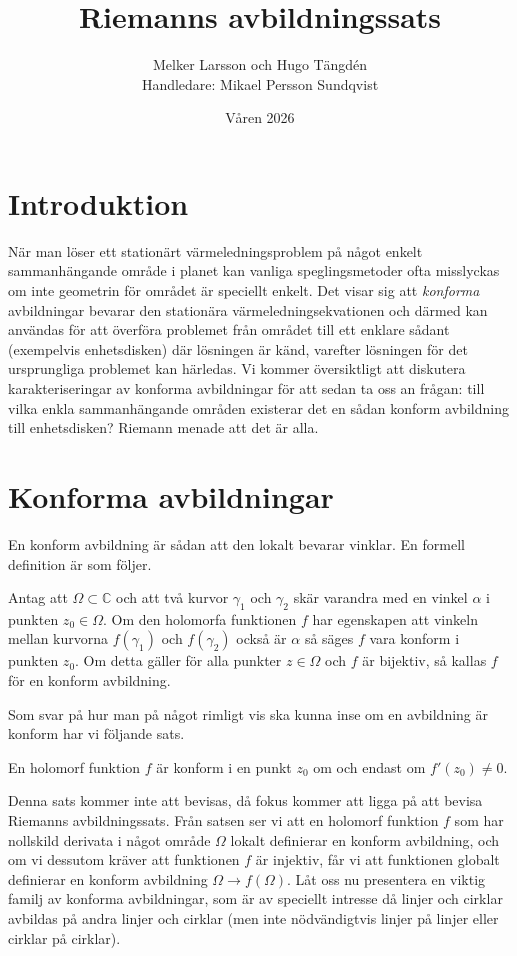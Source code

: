 \documentclass{article}
\title{Riemanns avbildningssats}
\author{Melker Larsson och Hugo Tängdén \\ \vspace{0.2cm} Handledare: Mikael Persson Sundqvist}
\date{Våren 2026}
\begin{document}
\maketitle

\section{Introduktion}
När man löser ett stationärt värmeledningsproblem på något enkelt sammanhängande område i planet kan vanliga speglingsmetoder ofta misslyckas om inte geometrin för området är speciellt enkelt. Det visar sig att \emph{konforma} avbildningar bevarar den stationära värmeledningsekvationen och därmed kan användas för att överföra problemet från området till ett enklare sådant (exempelvis enhetsdisken) där lösningen är känd, varefter lösningen för det ursprungliga problemet kan härledas. Vi kommer översiktligt att diskutera karakteriseringar av konforma avbildningar för att sedan ta oss an frågan: till vilka enkla sammanhängande områden existerar det en sådan konform avbildning till enhetsdisken? Riemann menade att det är alla.

\section{Konforma avbildningar}

En konform avbildning är sådan att den lokalt bevarar vinklar. En formell definition är som följer.
\begin{definition}
	Antag att $\Omega \subset \mathbb{C}$ och att två kurvor $\gamma_1$ och $\gamma_2$ skär varandra med en vinkel $\alpha$ i punkten $z_0 \in \Omega$. Om den holomorfa funktionen $f$ har egenskapen att vinkeln mellan kurvorna $f(\gamma_1)$ och $f(\gamma_2)$ också är $\alpha$ så säges $f$ vara konform i punkten $z_0$. Om detta gäller för alla punkter $z \in \Omega$ och $f$ är bijektiv, så kallas $f$ för en konform avbildning.
\end{definition}

Som svar på hur man på något rimligt vis ska kunna inse om en avbildning är konform har vi följande sats.

\begin{theorem}
	En holomorf funktion $f$ är konform i en punkt $z_0$ om och endast om $f'(z_0) \neq 0$.
\end{theorem}

Denna sats kommer inte att bevisas, då fokus kommer att ligga på att bevisa Riemanns avbildningssats. Från satsen ser vi att en holomorf funktion $f$ som har nollskild derivata i något område $\Omega$ lokalt definierar en konform avbildning, och om vi dessutom kräver att funktionen $f$ är injektiv, får vi att funktionen globalt definierar en konform avbildning $\Omega \to f(\Omega)$. Låt oss nu presentera en viktig familj av konforma avbildningar, som är av speciellt intresse då linjer och cirklar avbildas på andra linjer och cirklar (men inte nödvändigtvis linjer på linjer eller cirklar på cirklar).
\end{document}
